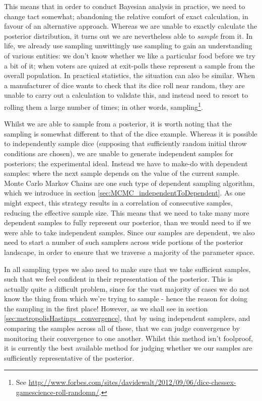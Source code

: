 \documentclass[11pt,fullpage]{book}
\begin{document}
This means that in order to conduct Bayesian analysis in practice, we need to change tact somewhat; abandoning the relative comfort of exact calculation, in favour of an alternative approach. Whereas we are unable to exactly calculate the posterior distribution, it turns out we are nevertheless able to \textit{sample} from it. In life, we already use sampling unwittingly use sampling to gain an understanding of various entities: we don't know whether we like a particular food before we try a bit of it; when voters are quized at exit-polls these represent a sample from the overall population. In practical statistics, the situation can also be similar. When a manufacturer of dice wants to check that its dice roll near random, they are unable to carry out a calculation to validate this, and instead need to resort to rolling them a large number of times; in other words, sampling\footnote{See \url{http://www.forbes.com/sites/davidewalt/2012/09/06/dice-chessex-gamescience-roll-randomn/}.}. 

Whilst we are able to sample from a posterior, it is worth noting that the sampling is somewhat different to that of the dice example. Whereas it is possible to independently sample dice (supposing that sufficiently random initial throw conditions are chosen), we are unable to generate independent samples for posteriors; the experimental ideal. Instead we have to make-do with dependent samples: where the next sample depends on the value of the current sample. Monte Carlo Markov Chains are one such type of dependent sampling algorithm, which we introduce in section \ref{sec:MCMC_independentToDependent}. As one might expect, this strategy results in a correlation of consecutive samples, reducing the effective sample size. This means that we need to take many more dependent samples to fully represent our posterior, than we would need to if we were able to take independent samples. Since our samples are dependent, we also need to start a number of such samplers across wide portions of the posterior landscape, in order to ensure that we traverse a majority of the parameter space.

In all sampling types we also need to make sure that we take sufficient samples, such that we feel confident in their representation of the posterior. This is actually quite a difficult problem, since for the vast majority of cases we do not know the thing from which we're trying to sample - hence the reason for doing the sampling in the first place! However, as we shall see in section \ref{sec:metropolisHastings_convergence}, that by using independent samplers, and comparing the samples across all of these, that we can judge convergence by monitoring their convergence to one another. Whilst this method isn't foolproof, it is currently the best available method for judging whether we our samples are sufficiently representative of the posterior.
\end{document}
